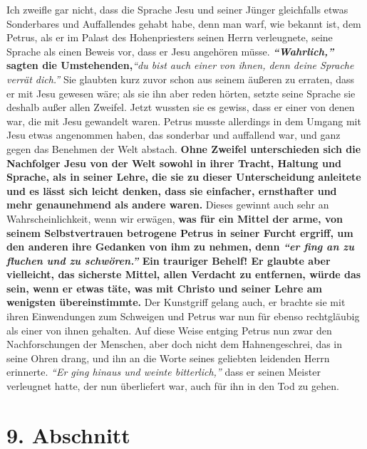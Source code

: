 Ich zweifle gar nicht, dass die Sprache Jesu
und seiner Jünger gleichfalls etwas
Sonderbares und Auffallendes gehabt habe, denn man warf, wie bekannt ist, dem
Petrus, als er im Palast des Hohenpriesters
seinen Herrn verleugnete, seine
Sprache als einen Beweis vor, dass er Jesu angehören müsse.
\textbf{\textit{"`Wahrlich,"'} sagten
die Umstehenden,}\textit{"`du bist auch einer von ihnen, denn deine Sprache
verrät
dich."'}
Sie glaubten kurz zuvor schon aus seinem äußeren
zu erraten, dass er mit Jesu gewesen wäre; als sie ihn aber reden hörten, setzte
seine Sprache sie deshalb außer allen Zweifel. Jetzt wussten sie es gewiss, dass
er
einer von denen war, die mit Jesu gewandelt waren. Petrus musste allerdings in
dem Umgang mit Jesu etwas angenommen haben, das sonderbar und auffallend war,
und ganz gegen das Benehmen der Welt abstach. \label{ref:10_08_sprache}
\textbf{Ohne Zweifel unterschieden sich
die Nachfolger Jesu von der Welt sowohl in ihrer
Tracht, Haltung und Sprache,
als in seiner Lehre, die sie zu dieser Unterscheidung anleitete und es lässt sich
leicht denken, dass sie einfacher,
ernsthafter und mehr genaunehmend als andere
waren.} Dieses gewinnt auch sehr an Wahrscheinlichkeit, wenn wir erwägen,
\textbf{was für
ein Mittel der arme, von seinem Selbstvertrauen betrogene Petrus in seiner
Furcht ergriff, um den anderen ihre Gedanken von ihm zu nehmen, denn
\textit{"`er fing
an zu fluchen und zu schwören."'} Ein trauriger Behelf! Er glaubte aber
vielleicht, das sicherste Mittel, allen Verdacht zu entfernen, würde das sein,
wenn er etwas täte, was mit Christo und seiner Lehre am wenigsten
übereinstimmte.} Der Kunstgriff gelang auch, er brachte sie mit ihren
Einwendungen zum Schweigen und Petrus war nun für ebenso
rechtgläubig als
einer von ihnen gehalten. Auf diese Weise entging Petrus nun zwar den
Nachforschungen der Menschen, aber doch nicht dem Hahnengeschrei, das in seine
Ohren drang, und ihn an die Worte seines geliebten leidenden Herrn erinnerte.
\textit{"`Er ging hinaus und weinte bitterlich,"'} dass er seinen Meister
verleugnet
hatte, der nun überliefert war, auch für ihn in den Tod zu gehen.

\section{9. Abschnitt} \label{kap10_ab9}


